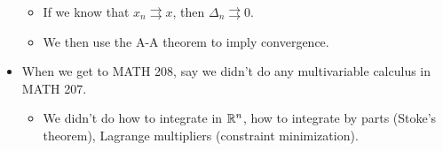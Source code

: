 \documentclass[../../notes.tex]{subfiles}
\begin{document}
\begin{itemize}
\begin{itemize}
        \item If we know that $x_n\rightrightarrows x$, then $\Delta_n\rightrightarrows 0$.
        \item We then use the A-A theorem to imply convergence.
    \end{itemize}
    \item When we get to MATH 208, say we didn't do any multivariable calculus in MATH 207.
    \begin{itemize}
        \item We didn't do how to integrate in $\mathbb{R}^n$, how to integrate by parts (Stoke's theorem), Lagrange multipliers (constraint minimization).
    \end{itemize}
\end{itemize}
\end{document}
